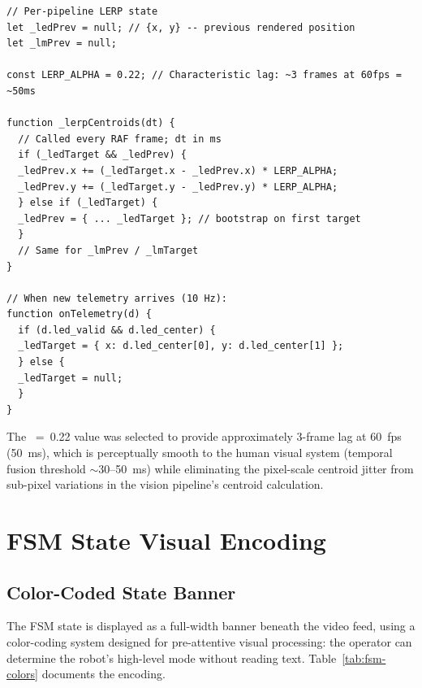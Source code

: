 \begin{lstlisting}[caption={LERP smoothing between telemetry updates}, label={lst:lerp-smoothing}]
// Per-pipeline LERP state
let _ledPrev = null; // {x, y} -- previous rendered position
let _lmPrev = null;

const LERP_ALPHA = 0.22; // Characteristic lag: ~3 frames at 60fps = ~50ms

function _lerpCentroids(dt) {
  // Called every RAF frame; dt in ms
  if (_ledTarget && _ledPrev) {
  _ledPrev.x += (_ledTarget.x - _ledPrev.x) * LERP_ALPHA;
  _ledPrev.y += (_ledTarget.y - _ledPrev.y) * LERP_ALPHA;
  } else if (_ledTarget) {
  _ledPrev = { ... _ledTarget }; // bootstrap on first target
  }
  // Same for _lmPrev / _lmTarget
}

// When new telemetry arrives (10 Hz):
function onTelemetry(d) {
  if (d.led_valid && d.led_center) {
  _ledTarget = { x: d.led_center[0], y: d.led_center[1] };
  } else {
  _ledTarget = null;
  }
}
\end{lstlisting}

The ~=~0.22 value was selected to provide approximately 3-frame lag at 60~fps (50~ms), which is perceptually smooth to the human visual system (temporal fusion threshold $\sim$30--50~ms) while eliminating the pixel-scale centroid jitter from sub-pixel variations in the vision pipeline's centroid calculation.

\section{FSM State Visual Encoding}

\subsection{Color-Coded State Banner}

The FSM state is displayed as a full-width banner beneath the video feed, using a color-coding system designed for pre-attentive visual processing: the operator can determine the robot's high-level mode without reading text. Table~\ref{tab:fsm-colors} documents the encoding.

